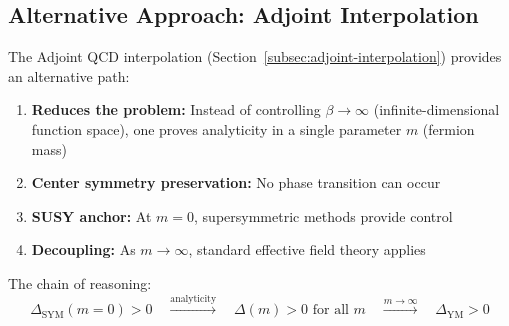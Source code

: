 \subsection{Alternative Approach: Adjoint Interpolation}

The Adjoint QCD interpolation (Section~\ref{subsec:adjoint-interpolation}) provides 
an alternative path:

\begin{enumerate}
\item \textbf{Reduces the problem:} Instead of controlling $\beta \to \infty$ 
(infinite-dimensional function space), one proves analyticity in a 
single parameter $m$ (fermion mass)
\item \textbf{Center symmetry preservation:} No phase transition can occur
\item \textbf{SUSY anchor:} At $m=0$, supersymmetric methods provide control
\item \textbf{Decoupling:} As $m \to \infty$, standard effective field theory applies
\end{enumerate}

The chain of reasoning:
\[
\Delta_{\text{SYM}}(m=0) > 0 \quad \xrightarrow{\text{analyticity}} \quad 
\Delta(m) > 0 \text{ for all } m \quad \xrightarrow{m \to \infty} \quad 
\Delta_{\text{YM}} > 0
\]








